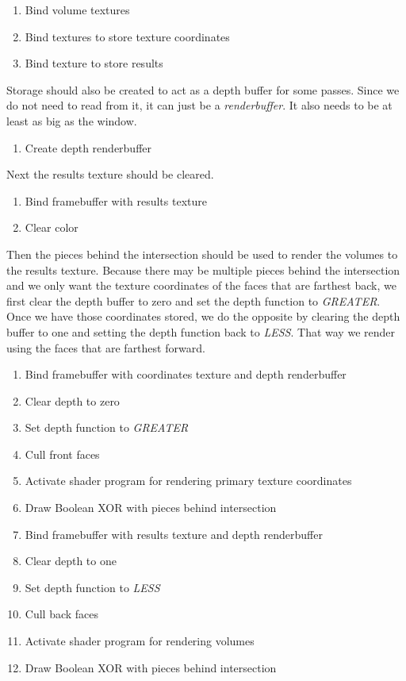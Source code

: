 \documentclass{report}
\begin{document}
\begin{enumerate}
  \item Bind volume textures
  \item Bind textures to store texture coordinates
  \item Bind texture to store results
\end{enumerate}

Storage should also be created to act as a depth buffer for some passes.  Since
we do not need to read from it, it can just be a \emph{renderbuffer}.  It also
needs to be at least as big as the window.

\begin{enumerate}
  \item Create depth renderbuffer
\end{enumerate}

Next the results texture should be cleared.

\begin{enumerate}
  \item Bind framebuffer with results texture
  \item Clear color
\end{enumerate}

Then the pieces behind the intersection should be used to render the volumes to
the results texture.  Because there may be multiple pieces behind the
intersection and we only want the texture coordinates of the faces that are
farthest back, we first clear the depth buffer to zero and set the depth
function to \emph{GREATER}.  Once we have those coordinates stored, we do the
opposite by clearing the depth buffer to one and setting the depth function back
to \emph{LESS}.  That way we render using the faces that are farthest forward.

\begin{enumerate}
  \item Bind framebuffer with coordinates texture and depth renderbuffer
  \item Clear depth to zero
  \item Set depth function to \emph{GREATER}
  \item Cull front faces
  \item Activate shader program for rendering primary texture coordinates
  \item Draw Boolean XOR with pieces behind intersection
  \item Bind framebuffer with results texture and depth renderbuffer
  \item Clear depth to one
  \item Set depth function to \emph{LESS}
  \item Cull back faces
  \item Activate shader program for rendering volumes
  \item Draw Boolean XOR with pieces behind intersection
\end{enumerate}
\end{document}
